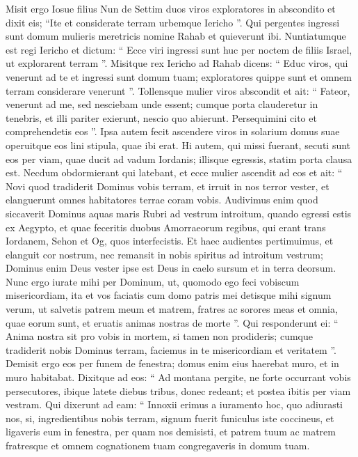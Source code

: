 \begin{biblechapter}
\begin{biblechapter}
\verse Misit ergo Iosue filius Nun de Settim duos viros exploratores in abscondito et dixit eis; “Ite et considerate terram urbemque Iericho ”. Qui pergentes ingressi sunt domum mulieris meretricis nomine Rahab et quieverunt ibi. 
\verse Nuntiatumque est regi Iericho et dictum: “ Ecce viri ingressi sunt huc per noctem de filiis Israel, ut explorarent terram ”. 
\verse Misitque rex Iericho ad Rahab dicens: “ Educ viros, qui venerunt ad te et ingressi sunt domum tuam; exploratores quippe sunt et omnem terram considerare venerunt ”. 
\verse Tollensque mulier viros abscondit et ait: “ Fateor, venerunt ad me, sed nesciebam unde essent; 
\verse cumque porta clauderetur in tenebris, et illi pariter exierunt, nescio quo abierunt. Persequimini cito et comprehendetis eos ”. 
\verse Ipsa autem fecit ascendere viros in solarium domus suae operuitque eos lini stipula, quae ibi erat. 
\verse Hi autem, qui missi fuerant, secuti sunt eos per viam, quae ducit ad vadum Iordanis; illisque egressis, statim porta clausa est.
 \verse Necdum obdormierant qui latebant, et ecce mulier ascendit ad eos et ait: 
\verse “ Novi quod tradiderit Dominus vobis terram, et irruit in nos terror vester, et elanguerunt omnes habitatores terrae coram vobis. 
\verse Audivimus enim quod siccaverit Dominus aquas maris Rubri ad vestrum introitum, quando egressi estis ex Aegypto, et quae feceritis duobus Amorraeorum regibus, qui erant trans Iordanem, Sehon et Og, quos interfecistis. 
\verse Et haec audientes pertimuimus, et elanguit cor nostrum, nec remansit in nobis spiritus ad introitum vestrum; Dominus enim Deus vester ipse est Deus in caelo sursum et in terra deorsum. 
 \verse Nunc ergo iurate mihi per Dominum, ut, quomodo ego feci vobiscum misericordiam, ita et vos faciatis cum domo patris mei detisque mihi signum verum, 
\verse ut salvetis patrem meum et matrem, fratres ac sorores meas et omnia, quae eorum sunt, et eruatis animas nostras de morte ”. 
\verse Qui responderunt ei: “ Anima nostra sit pro vobis in mortem, si tamen non prodideris; cumque tradiderit nobis Dominus terram, faciemus in te misericordiam et veritatem ”. 
\verse Demisit ergo eos per funem de fenestra; domus enim eius haerebat muro, et in muro habitabat. 
\verse Dixitque ad eos: “ Ad montana pergite, ne forte occurrant vobis persecutores, ibique latete diebus tribus, donec redeant; et postea ibitis per viam vestram. 
\verse Qui dixerunt ad eam: “ Innoxii erimus a iuramento hoc, quo adiurasti nos, 
\verse si, ingredientibus nobis terram, signum fuerit funiculus iste coccineus, et ligaveris eum in fenestra, per quam nos demisisti, et patrem tuum ac matrem fratresque et omnem cognationem tuam congregaveris in domum tuam. 

\end{biblechapter}
\end{biblechapter}
